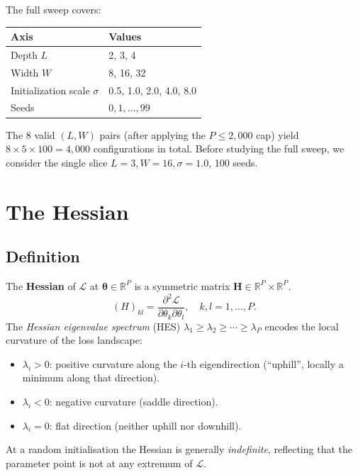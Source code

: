 \documentclass[12pt,a4paper]{article}
\newcommand{\R}{\mathbb{R}}
\newcommand{\btheta}{\boldsymbol{\theta}}
\newcommand{\bH}{\mathbf{H}}
\begin{document}
The full sweep covers:
\begin{center}
\label{tab:sweep}
  \begin{tabular}{ll}
    \toprule
    Axis & Values \\
    \midrule
    Depth $L$ & 2, 3, 4 \\
    Width $W$ & 8, 16, 32 \\
    Initialization scale $\sigma$ & 0.5, 1.0, 2.0, 4.0, 8.0 \\
    Seeds & $0, 1, \ldots, 99$ \\
    \bottomrule
  \end{tabular}
\end{center}
The 8 valid $(L,W)$ pairs (after applying the $P \leq 2{,}000$ cap) yield
$8 \times 5 \times 100 = 4{,}000$ configurations in total.
Before studying the full sweep, we consider the single slice $L=3, W=16, \sigma=1.0$, 100 seeds.


\section{The Hessian}
\label{sec:hessian}

\subsection{Definition}
\label{ssec:hessian_def}

The \textbf{Hessian} of $\mathcal{L}$ at $\btheta \in \R^P$ is a symmetric matrix $\bH \in \mathbb{R}^P \times \mathbb{R}^P$.
\begin{equation}
  (H)_{kl} = \frac{\partial^2 \mathcal{L}}{\partial \theta_k \partial \theta_l},
  \quad k,l = 1,\ldots,P.
  \label{eq:hessian_def}
\end{equation}
The \emph{Hessian eigenvalue spectrum} (HES) $\lambda_1 \geq \lambda_2 \geq \cdots \geq \lambda_P$ encodes the local curvature
of the loss landscape:
\begin{itemize}
  \item $\lambda_i > 0$: positive curvature along the $i$-th eigendirection
    (``uphill'', locally a minimum along that direction).
  \item $\lambda_i < 0$: negative curvature (saddle direction).
  \item $\lambda_i = 0$: flat direction (neither uphill nor downhill).
\end{itemize}
At a random initialisation the Hessian is generally \emph{indefinite}, reflecting that the parameter point is not at any
extremum of $\mathcal{L}$.
\end{document}
